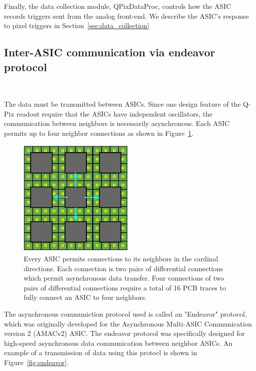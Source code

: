 Finally, the data collection module, QPixDataProc, controls how the ASIC records triggers sent from the analog front-end.
We describe the ASIC's response to pixel triggers in Section~\ref{sec:data_collection}


\subsection{Inter-ASIC communication via endeavor protocol}~\label{sec:endeavor}

The data must be transmitted between ASICs.
Since one design feature of the Q-Pix readout require that the ASICs have independent oscillators, the communication between neighbors is necessarily asynchronous.
Each ASIC permits up to four neighbor connections as shown in Figure~\ref{fig:example_connections}.


\begin{figure}[]
\centering
\includegraphics[width=0.5\textwidth]{images/asic_neighbor_connections_qpix.png}
\caption{Every ASIC permits connections to its neighbors in the cardinal directions.
Each connection is two pairs of differential connections which permit asynchronous data transfer.
Four connections of two pairs of differential connections require a total of 16 PCB traces to fully connect an ASIC to four neighbors.
}
\label{fig:example_connections}
\end{figure}

The asynchronous communiction protocol used is called an "Endeavor" protocol, which was originally developed for the Asynchronous Multi-ASIC Communication version 2 (AMACv2) ASIC.
The endeavor protocol was specifically designed for high-speed asynchronous data communication between neighbor ASICs.
An example of a transmission of data using this protocl is shown in Figure~\ref{fig:endeavor}.

